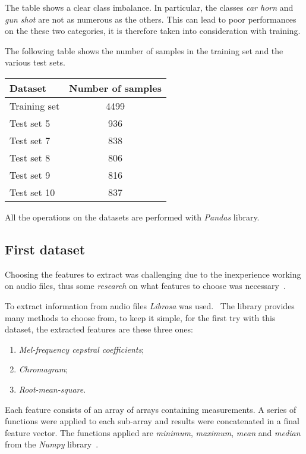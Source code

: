 The table shows a clear class imbalance. In particular, the classes 
\emph{car horn} and \emph{gun shot} are not as numerous as the others. 
This can lead to poor performances on the these two categories, it is
therefore taken 
into consideration with training. 

The following table shows the number of samples in the training set and 
the various test sets.

\begin{center}
    \begin{tabular}{ |l|c| } 
        \hline
        Dataset & Number of samples \\
        \hline
        Training set & 4499 \\
        Test set 5 & 936 \\
        Test set 7 & 838 \\
        Test set 8 & 806 \\
        Test set 9 & 816 \\
        Test set 10 & 837 \\
        \hline
    \end{tabular}
\end{center}

All the operations on the datasets are performed with \emph{Pandas} library.~\cite{pandas}

\subsection{First dataset}
Choosing the features to extract was challenging due to the inexperience working on audio files, thus some \emph{research} on what features to 
choose was necessary~\cite{features}.

To extract information from audio files \emph{Librosa} was used.~\cite{librosa}
The library provides many methods to choose from,
to keep it simple, for the first try with this dataset, the extracted features 
are these three ones: 
\begin{enumerate}
    \item \emph{Mel-frequency cepstral coefficients};
    \item \emph{Chromagram};
    \item \emph{Root-mean-square}.
\end{enumerate}
Each feature consists of an array of arrays containing measurements. 
A series of functions were applied to each sub-array and results 
were concatenated in a final feature vector. 
The functions applied are \emph{minimum}, \emph{maximum}, \emph{mean} 
and \emph{median} from the \emph{Numpy} library~\cite{numpy}.

